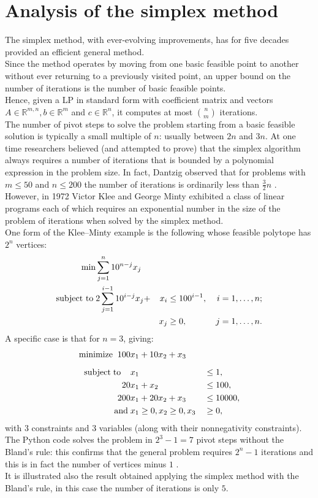 \documentclass[a4paper,10 pt,titlepage,twoside]{book}
\theoremstyle{plain}
\theoremstyle{definition}
\theoremstyle{remark}
\begin{document}
 \section{Analysis of the simplex method}
The simplex method, with ever-evolving improvements, has for five decades provided an efficient general
method. \\
 Since the method operates by moving from one basic feasible point
to another without ever returning to a previously visited point, an upper bound
on the number of iterations is the number of basic feasible points.\\Hence, given a LP in standard form with
coefficient matrix and vectors $A\in\mathbb{R}^{m,n}, b\in\mathbb{R}^{m}$ and $c\in\mathbb{R}^{n}$, it computes at most $n\choose m$ iterations.\\
The number of pivot steps to solve
the problem starting from a basic feasible solution is typically a small multiple of
$n$: usually between $2n$ and $3n$. At one time researchers believed (and attempted to prove) that the simplex algorithm always requires a number of iterations that is
bounded by a polynomial expression in the problem size. In fact, Dantzig observed that for problems with
$m \leq 50$ and $n \leq 200$ the number of iterations is ordinarily less than $\frac{3}{2}n$ \cite{DAN}.
\\ However, in 1972 Victor Klee and George Minty exhibited a class of linear programs each of which requires an
exponential number in the size of the problem of iterations when solved by the simplex method.\\
One form of the Klee–Minty example is the following whose feasible polytope has $2^{n}$
vertices:
\begin{alignat*}{4}
\min &\sum_{j=1}^{n}10^{n-j}x_{j}&&&\\
\text{subject to\;}&2\sum_{j=1}^{i-1}10^{i-j}x_{j}+&x_{i}&\leq 100^{i-1}, \, &i = 1,\dots, n;\\
&&x_{j}&\geq 0, \,&j = 1,\dots, n.\\
\end{alignat*}
A specific case is that for $n = 3$, giving:
\begin{alignat*}{2}
\text{minimize\;}\; 100& x_1+10x_2+ x_3&&\\[2mm]
\text{subject\;to\;\;\;\;} &x_1&&\leq 1,\\
						20& x_1+x_2&&\leq 100,\\
200 &x_1 +20x_2 +x_{3}&&\leq 10000,\\
\text{and}\;& x_1\geq 0,x_2\geq 0,x_3&&\geq 0,
\end{alignat*}
with 3 constraints and 3 variables (along with their nonnegativity constraints).\\
The Python code solves the problem in $2^{3} - 1 = 7$ pivot steps without the Bland's rule: this confirms that the general problem requires $2^{n}- 1$ iterations and this is in fact
the number of vertices minus $1$ \cite{MINTY}.\\ It is illustrated also the result obtained applying the simplex method with the Bland's rule, in this case the number of iterations is only $5$.  \\
\end{document}
